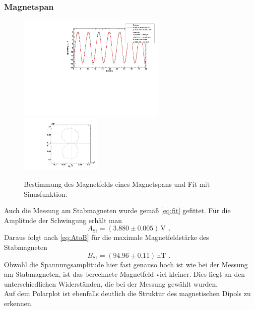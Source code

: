 \subsubsection{Magnetspan}
\begin{figure}[H]
\begin{center}
  \includegraphics[width=0.64\textwidth]{../img/fit_Magnetspan_45grad.pdf}
  \includegraphics[width=0.35\textwidth]{../img/polar_Magnetspan_45grad.pdf}
  \caption{Bestimmung des Magnetfelds eines Magnetspans und Fit mit Sinusfunktion.}
  \label{img:magnetspan}
\end{center}
\end{figure}
Auch die Messung am Stabmagneten wurde gemäß \autoref{eq:fit} gefittet.
Für die Amplitude der Schwingung erhält man
\begin{equation}
\label{}
A_{\text{St}}=(3.880 \pm 0.005)\, \text{V} \ \, .
\end{equation}
Daraus folgt nach \autoref{eq:AtoB} für die maximale Magnetfeldstärke des Stabmagneten
\begin{equation}
\label{}
B_{\text{St}} = (94.96 \pm 0.11)\,\text{nT} \ \, .
\end{equation}
Obwohl die Spannungsamplitude hier fast genauso hoch ist wie bei der Messung am Stabmagneten,
ist das berechnete Magnetfeld viel kleiner. Dies liegt an den unterschiedlichen Widerständen,
die bei der Messung gewählt wurden.\\ 
Auf dem Polarplot ist ebenfalls deutlich die Struktur des magnetischen Dipols zu erkennen.


